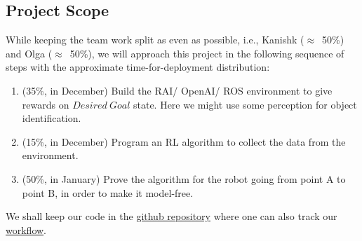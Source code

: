 \documentclass[a4paper,11pt,twoside]{article}
\begin{document}
\subsection{Project Scope} \label{SubSec:ProjectScope}
While keeping the team work split as even as possible, i.e., Kanishk ($\approx$~50\%) and Olga ($\approx$~50\%), we will approach this project in the following sequence of steps with the approximate time-for-deployment distribution:
\begin{enumerate}
    \item (35\%, in December) Build the RAI/ OpenAI/ ROS environment to give rewards on $Desired~Goal$ state. Here we might use some perception for object identification.
    \item (15\%, in December) Program an RL algorithm to collect the data from the environment.
    \item (50\%, in January) Prove the algorithm for the robot going from point A to point B, in order to make it model-free.
\end{enumerate}

We shall keep our code in the \href{https://github.com/KanishkNavale/robotics-lab-project}{github repository} where one can also track our \href{https://github.com/users/KanishkNavale/projects/1/views/1}{workflow}.

\end{document}
